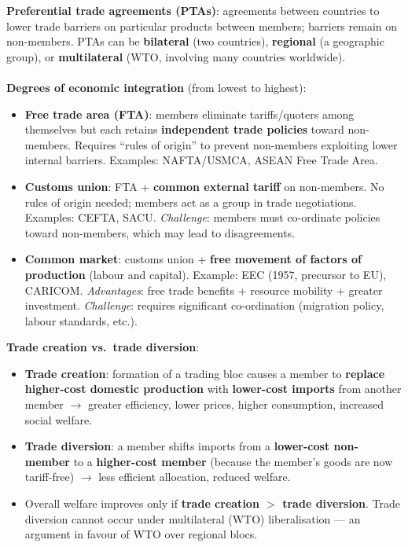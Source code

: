 \documentclass[a4paper,12pt]{article}
\begin{document}
\textbf{Preferential trade agreements (PTAs)}: agreements between countries to lower trade barriers on particular products between members; barriers remain on non-members. PTAs can be \textbf{bilateral} (two countries), \textbf{regional} (a geographic group), or \textbf{multilateral} (WTO, involving many countries worldwide).
\\\\
\textbf{Degrees of economic integration} (from lowest to highest):
\begin{itemize}
  \item \textbf{Free trade area (FTA)}: members eliminate tariffs/quoters among themselves but each retains \textbf{independent trade policies} toward non-members. Requires ``rules of origin'' to prevent non-members exploiting lower internal barriers. Examples: NAFTA/USMCA, ASEAN Free Trade Area.
  \item \textbf{Customs union}: FTA + \textbf{common external tariff} on non-members. No rules of origin needed; members act as a group in trade negotiations. Examples: CEFTA, SACU. \textit{Challenge}: members must co-ordinate policies toward non-members, which may lead to disagreements.
  \item \textbf{Common market}: customs union + \textbf{free movement of factors of production} (labour and capital). Example: EEC (1957, precursor to EU), CARICOM. \textit{Advantages}: free trade benefits + resource mobility + greater investment. \textit{Challenge}: requires significant co-ordination (migration policy, labour standards, etc.).
\end{itemize}
\textbf{Trade creation vs.\ trade diversion}:
\begin{itemize}
  \item \textbf{Trade creation}: formation of a trading bloc causes a member to \textbf{replace higher-cost domestic production} with \textbf{lower-cost imports} from another member $\to$ greater efficiency, lower prices, higher consumption, increased social welfare.
  \item \textbf{Trade diversion}: a member shifts imports from a \textbf{lower-cost non-member} to a \textbf{higher-cost member} (because the member's goods are now tariff-free) $\to$ less efficient allocation, reduced welfare.
  \item Overall welfare improves only if \textbf{trade creation $>$ trade diversion}. Trade diversion cannot occur under multilateral (WTO) liberalisation --- an argument in favour of WTO over regional blocs.
\end{itemize}
\end{document}
